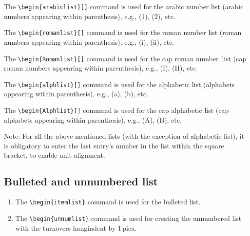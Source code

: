 \documentclass{ws-ijbc}
\begin{document}
\begin{arabiclist}[(5)]
\item The \verb|\begin{arabiclist}[]| command is used for the arabic
number list (arabic numbers appearing within parenthesis), e.g.,
(1), (2), etc.

\smallskip

\item The \verb|\begin{romanlist}[]| command is used for the roman
number list (roman numbers appearing within parenthesis), e.g., (i),
(ii), etc.

\smallskip

\item The \verb|\begin{Romanlist}[]| command is used for the cap roman
\hbox{number list} (cap roman numbers appearing within parenthesis),
e.g., (I), (II), etc.

\smallskip

\item The \verb|\begin{alphlist}[]| command is used for the alphabetic
list (alphabets appearing within parenthesis), e.g., (a), (b), etc.

\smallskip

\item The \verb|\begin{Alphlist}[]| command is used for the cap
alphabetic list (cap alphabets appearing within parenthesis),
e.g., (A), (B), etc.
\end{arabiclist}
Note: For all the above mentioned lists (with the exception of
alphabetic list), it is obligatory to enter the last entry's number
in the list within the square bracket, to enable unit alignment.

\subsection{Bulleted and unnumbered list}

\begin{enumerate}
\item[] The \verb|\begin{itemlist}| command is used for the bulleted list.

\smallskip

\item[] The \verb|\begin{unnumlist}| command is used for creating the
  unnumbered list with the turnovers hangindent by 1\,pica.
\end{enumerate}
\end{document}
